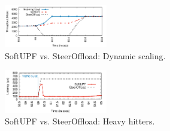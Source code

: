 \begin{figure}[t]
    \centering
     \includegraphics[width=0.4\textwidth]{graphs/dynScaling} %
     \setlength{\abovecaptionskip}{4pt}
     \setlength{\belowcaptionskip}{-8pt}
 \caption{SoftUPF vs. SteerOffload: Dynamic scaling.}
 \label{fig:AvsB_dyn_scl}
\end{figure}

\begin{figure}[t]
 \centering
\includegraphics[width=0.4\textwidth]{graphs/heavyHitter}
 \setlength{\abovecaptionskip}{4pt}
 \setlength{\belowcaptionskip}{-8pt}
  \caption{SoftUPF vs. SteerOffload: Heavy hitters.}
  \vspace{-2mm}
 \label{fig:AvsB_rebal}
\end{figure}


